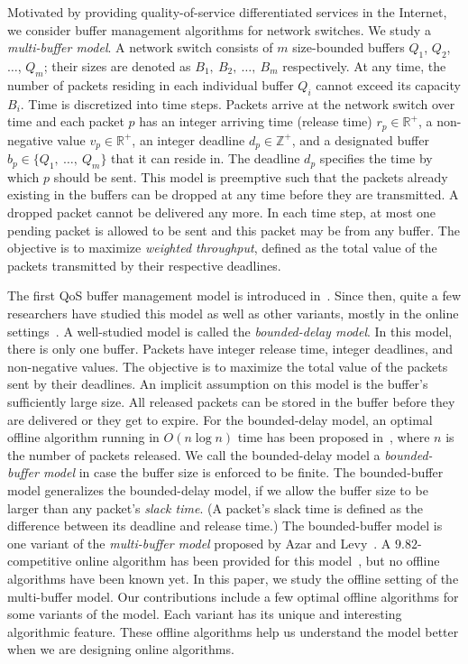 \documentclass[final, 11pt]{article}
\begin{document}
Motivated by providing quality-of-service differentiated services in the Internet, we consider buffer management algorithms for network switches. We study a {\em multi-buffer model}. A network switch consists of $m$ size-bounded buffers $Q_1$, $Q_2$, $\ldots$, $Q_m$; their sizes are denoted as $B_1, \ B_2, \ \ldots, \ B_m$ respectively. At any time, the number of packets residing in each individual buffer $Q_i$ cannot exceed its capacity $B_i$. Time is discretized into time steps. Packets arrive at the network switch over time and each packet $p$ has an integer arriving time (release time) $r_p \in \mathbb R^+$, a non-negative value $v_p \in \mathbb R^+$, an integer deadline $d_p \in \mathbb Z^+$, and a designated buffer $b_p \in \{Q_1, \ \ldots, \ Q_m\}$ that it can reside in. The deadline $d_p$ specifies the time by which $p$ should be sent. This model is preemptive such that the packets already existing in the buffers can be dropped at any time before they are transmitted. A dropped packet cannot be delivered any more. In each time step, at most one pending packet is allowed to be sent and this packet may be from any buffer. The objective is to maximize {\em weighted throughput}, defined as the total value of the packets transmitted by their respective deadlines.

The first QoS buffer management model is introduced in~\cite{AMRR05}. Since then, quite a few researchers have studied this model as well as other variants, mostly in the online settings~\cite{KLMPSS04, H01, CJST07, LSS05, EW07}. A well-studied model is called the {\em bounded-delay model}. In this model, there is only one buffer. Packets have integer release time, integer deadlines, and non-negative values. The objective is to maximize the total value of the packets sent by their deadlines. An implicit assumption on this model is the buffer's sufficiently large size. All released packets can be stored in the buffer before they are delivered or they get to expire. For the bounded-delay model, an optimal offline algorithm running in $O(n \log n)$ time has been proposed in~\cite{KLMPSS04}, where $n$ is the number of packets released. We call the bounded-delay model a {\em bounded-buffer model} in case the buffer size is enforced to be finite. The bounded-buffer model generalizes the bounded-delay model, if we allow the buffer size to be larger than any packet's {\em slack time}. (A packet's slack time is defined as the difference between its deadline and release time.) The bounded-buffer model is one variant of the {\em multi-buffer model} proposed by Azar and Levy~\cite{AL06}. A $9.82$-competitive online algorithm has been provided for this model~\cite{AL06}, but no offline algorithms have been known yet. In this paper, we study the offline setting of the multi-buffer model. Our contributions include a few optimal offline algorithms for some variants of the model. Each variant has its unique and interesting algorithmic feature. These offline algorithms help us understand the model better when we are designing online algorithms.
\end{document}
